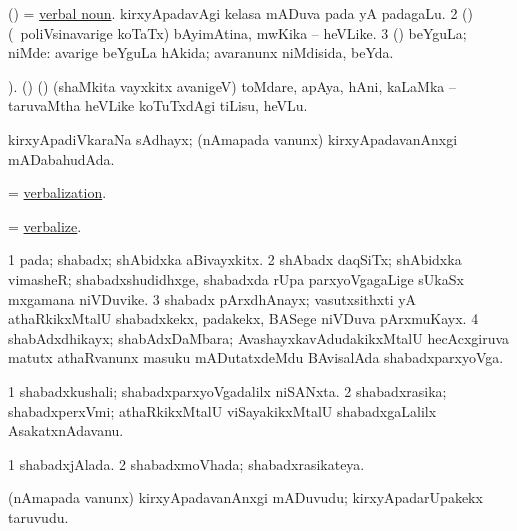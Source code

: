 \bentry
{} 
\gl{\nA}
\expl{}
\bmng
\bnum
{} 
\banum
{} (\vAyx) = \hyperlink{verbal noun}{verbal noun}. 
 kirxyApadavAgi kelasa mADuva pada yA padagaLu. 
\eanum
\numie
\num{2} (\ashi) (\kanmu\ poliVsinavarige koTaTx) bAyimAtina, mwKika -- heVLike. 
\num{3} (\ashi) beYguLa; niMde:  avarige beYguLa hAkida; avaranunx niMdisida, beYda. 
\enum
\emng
\eentry

\bentry
{} 
\gl{\sakirx}
). \bmng
 (\birx) (\ashi) (shaMkita vayxkitx avanigeV) toMdare, apAya, hAni, kaLaMka -- taruvaMtha heVLike koTuTxdAgi tiLisu, heVLu. 
\emng
\eentry

\bentry
{} 
\gl{\gu}
\expl{}
\bmng
 kirxyApadiVkaraNa sAdhayx; (nAmapada \mo vanunx) kirxyApadavanAnxgi mADabahudAda. 
\emng
\eentry

\bentry
{} 
\gl{\nA}
\expl{}
\bmng
 = \hyperlink{verbalization}{verbalization}. 
\emng
\eentry

\bentry
{} 
\gl{\kirx}
\expl{}
\bmng
 = \hyperlink{verbalize}{verbalize}. 
\emng
\eentry

\bentry
{} 
\gl{\nA}
\expl{}
\bmng
\bnum
\num{1} pada; shabadx; shAbidxka aBivayxkitx. 
\num{2} shAbadx daqSiTx; shAbidxka vimasheR; shabadxshudidhxge, shabadxda rUpa parxyoVgagaLige sUkaSx mxgamana niVDuvike. 
\num{3} shabadx pArxdhAnayx; vasutxsithxti yA athaRkikxMtalU shabadxkekx, padakekx, BASege niVDuva pArxmuKayx. 
\num{4} shabAdxdhikayx; shabAdxDaMbara; AvashayxkavAdudakikxMtalU hecAcxgiruva matutx athaRvanunx masuku mADutatxdeMdu BAvisalAda shabadxparxyoVga. 
\enum
\emng
\eentry

\bentry
{} 
\gl{\nA}
\expl{}
\bmng
\bnum
\num{1} shabadxkushali; shabadxparxyoVgadalilx niSANxta. 
\num{2} shabadxrasika; shabadxperxVmi; athaRkikxMtalU viSayakikxMtalU shabadxgaLalilx AsakatxnAdavanu. 
\enum
\emng
\eentry

\bentry
{} 
\gl{\gu}
\expl{}
\bmng
\bnum
\num{1} shabadxjAlada. 
\num{2} shabadxmoVhada; shabadxrasikateya. 
\enum
\emng
\eentry

\bentry
{} 
\gl{\nA}
\expl{}
\bmng
 (nAmapada \mo vanunx) kirxyApadavanAnxgi mADuvudu; kirxyApadarUpakekx taruvudu. 
\emng
\eentry

